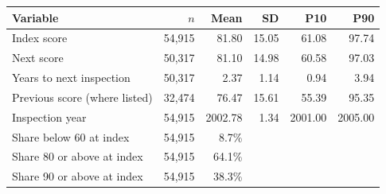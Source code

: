 \begin{tabular}{lrrrrr}
\toprule
Variable & $n$ & Mean & SD & P10 & P90 \\
\midrule
Index score & 54,915 & 81.80 & 15.05 & 61.08 & 97.74 \\
Next score & 50,317 & 81.10 & 14.98 & 60.58 & 97.03 \\
Years to next inspection & 50,317 & 2.37 & 1.14 & 0.94 & 3.94 \\
Previous score (where listed) & 32,474 & 76.47 & 15.61 & 55.39 & 95.35 \\
Inspection year & 54,915 & 2002.78 & 1.34 & 2001.00 & 2005.00 \\
Share below 60 at index & 54,915 & 8.7\% & & & \\
Share 80 or above at index & 54,915 & 64.1\% & & & \\
Share 90 or above at index & 54,915 & 38.3\% & & & \\
\bottomrule
\end{tabular}
